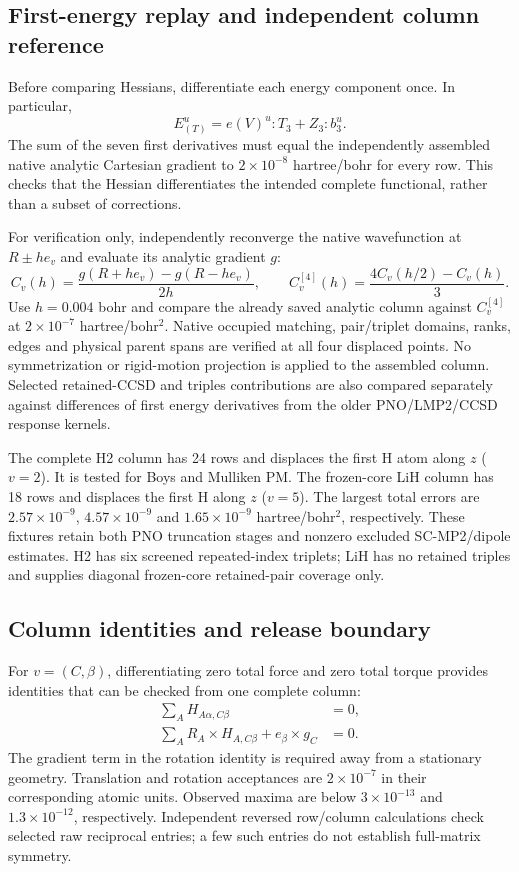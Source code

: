 \documentclass[11pt]{article}
\begin{document}
\subsection{First-energy replay and independent column reference}
Before comparing Hessians, differentiate each energy component once.
In particular,
\begin{equation}
 E_{(T)}^u=e(V)^u:T_3+Z_3:b^u_3.
\end{equation}
The sum of the seven first derivatives must equal the independently
assembled native analytic Cartesian gradient to $2\times10^{-8}$
hartree/bohr for every row. This checks that the Hessian differentiates
the intended complete functional, rather than a subset of corrections.

For verification only, independently reconverge the native wavefunction
at $R\pm h e_v$ and evaluate its analytic gradient $g$:
\begin{equation}
 C_v(h)=\frac{g(R+h e_v)-g(R-h e_v)}{2h},\qquad
 C_v^{[4]}(h)=\frac{4C_v(h/2)-C_v(h)}3.
\end{equation}
Use $h=0.004$ bohr and compare the already saved analytic column against
$C_v^{[4]}$ at $2\times10^{-7}$ hartree/bohr$^2$. Native occupied matching,
pair/triplet domains, ranks, edges and physical parent spans are verified
at all four displaced points. No symmetrization or rigid-motion projection
is applied to the assembled column. Selected retained-CCSD and triples
contributions are also compared separately against differences of first
energy derivatives from the older PNO/LMP2/CCSD response kernels.

The complete H2 column has 24 rows and displaces the first H atom along
$z$ ($v=2$). It is tested for Boys and Mulliken PM. The frozen-core LiH
column has 18 rows and displaces the first H along $z$ ($v=5$).
The largest total errors are $2.57\times10^{-9}$, $4.57\times10^{-9}$ and
$1.65\times10^{-9}$ hartree/bohr$^2$, respectively. These fixtures retain
both PNO truncation stages and nonzero excluded SC-MP2/dipole estimates.
H2 has six screened repeated-index triplets; LiH has no retained triples
and supplies diagonal frozen-core retained-pair coverage only.

\subsection{Column identities and release boundary}
For $v=(C,\beta)$, differentiating zero total force and zero total torque
provides identities that can be checked from one complete column:
\begin{align}
 \sum_A H_{A\alpha,C\beta}&=0,\\
 \sum_A R_A\mathbin{\times}H_{A,C\beta}
             +e_\beta\mathbin{\times}g_C&=0.
\end{align}
The gradient term in the rotation identity is required away from a
stationary geometry. Translation and rotation acceptances are
$2\times10^{-7}$ in their corresponding atomic units. Observed maxima are
below $3\times10^{-13}$ and $1.3\times10^{-12}$, respectively. Independent
reversed row/column calculations check selected raw reciprocal entries;
a few such entries do not establish full-matrix symmetry.
\end{document}
